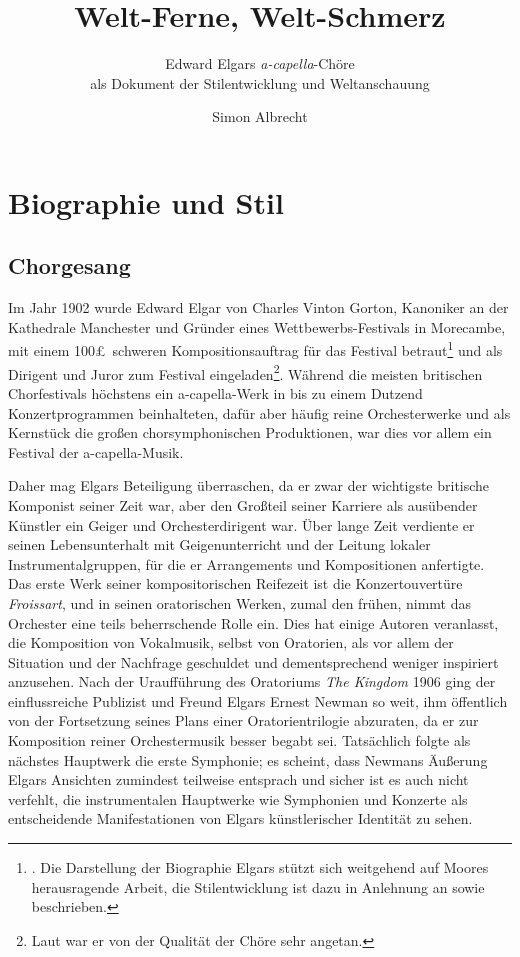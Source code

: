 \documentclass[a4paper,11pt,open=any]{scrbook}
\author{Simon Albrecht}
\title{Welt-Ferne, Welt-Schmerz}
\subtitle{
Edward Elgars \textit{a-capella}-Chöre \\
als Dokument der Stilentwicklung und Weltanschauung
}
\begin{document}
\maketitle

\tableofcontents

\chapter{Biographie und Stil}

\section{Chorgesang}
Im Jahr 1902 wurde Edward Elgar von Charles Vinton Gorton, Kanoniker an der
Kathedrale Manchester und Gründer eines Wettbewerbs-Festivals in Morecambe,
mit einem 100\pounds\ schweren Kompositionsauftrag für das Festival
betraut\footnote{\cite[S.~376]{moore}.  Die Darstellung der Biographie
Elgars stützt sich weitgehend auf Moores herausragende Arbeit, die
Stilentwicklung ist dazu in Anlehnung an \cite[S.~12–24]{harperscott2006}
sowie \cite{butt-rcath} beschrieben.} und als Dirigent und Juror zum Festival
eingeladen\footnote{\cite[S.~viii.]{ece13}  Laut \cite[S.~128f.]{elgar-letters}
war er von der Qualität der Chöre sehr angetan.}.  Während die meisten
britischen Chorfestivals höchstens ein a-capella-Werk in bis zu einem Dutzend
Konzertprogrammen beinhalteten, dafür aber häufig reine Orchesterwerke und als
Kernstück die großen chorsymphonischen Produktionen, war dies vor allem ein
Festival der a-capella-Musik.

Daher mag Elgars Beteiligung überraschen, da er zwar der wichtigste britische
Komponist seiner Zeit war, aber den Großteil seiner Karriere als ausübender
Künstler ein Geiger und Orchesterdirigent war.  Über lange Zeit verdiente
er seinen Lebensunterhalt mit Geigenunterricht und der Leitung lokaler
Instrumentalgruppen, für die er Arrangements und Kompositionen anfertigte.
Das erste Werk seiner kompositorischen Reifezeit ist die Konzertouvertüre
\textit{Froissart}, und in seinen oratorischen Werken, zumal den frühen,
nimmt das Orchester eine teils beherrschende Rolle ein.  Dies hat einige
Autoren veranlasst, die Komposition von Vokalmusik, selbst von Oratorien,
als vor allem der Situation und der Nachfrage geschuldet und dementsprechend
weniger inspiriert anzusehen.  Nach der Uraufführung des Oratoriums \textit{The
Kingdom} 1906 ging der einflussreiche Publizist und Freund Elgars Ernest
Newman so weit, ihm öffentlich von der Fortsetzung seines Plans einer
Oratorientrilogie abzuraten\cite[S.~507]{moore}, da er zur Komposition
reiner Orchestermusik besser begabt sei.  Tatsächlich folgte als nächstes
Hauptwerk die erste Symphonie; es scheint, dass Newmans Äußerung Elgars
Ansichten zumindest teilweise entsprach und sicher ist es auch nicht
verfehlt, die instrumentalen Hauptwerke wie Symphonien und Konzerte als
entscheidende Manifestationen von Elgars künstlerischer Identität zu sehen.
\end{document}
